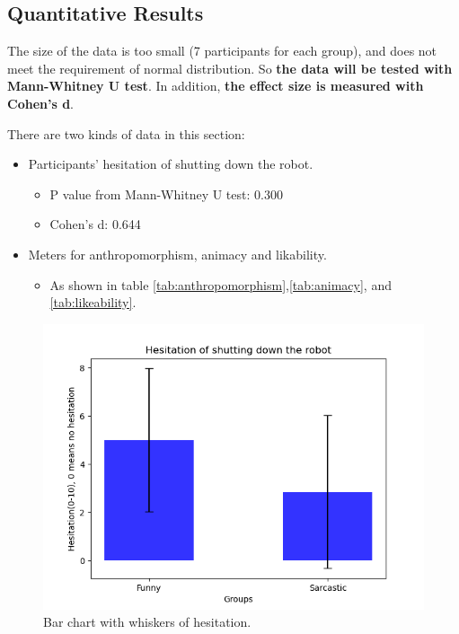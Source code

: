 \documentclass[conference]{IEEEtran}
\begin{document}
\subsection{Quantitative Results}


The size of the data is too small (7 participants for each group), and does not meet the requirement of normal distribution. So \textbf{the data will be tested with Mann-Whitney U test}. In addition, \textbf{the effect size is measured with Cohen's d}.

There are two kinds of data in this section: 
\begin{itemize}
    \item Participants' hesitation of shutting down the robot.
    \begin{itemize}
        \item P value from Mann-Whitney U test: 0.300
        \item Cohen's d: 0.644
    \end{itemize}
    \item Meters for anthropomorphism, animacy and likability.
    \begin{itemize}
        \item As shown in table \ref{tab:anthropomorphism},\ref{tab:animacy}, and \ref{tab:likeability}.
    \end{itemize} 
\end{itemize}

    \begin{figure}[htbp]
        \centering
        \includegraphics[width = \linewidth]{Pics/HesitationBar.png}
        \caption{Bar chart with whiskers of hesitation.}
        \label{fig:HesitationBar}
    \end{figure}
    
\end{document}
